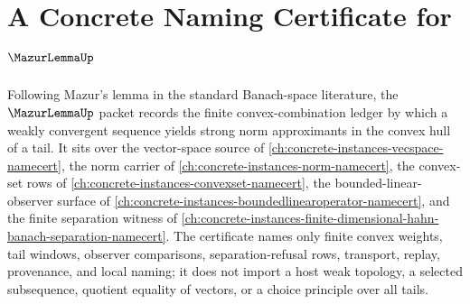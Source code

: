\chapter{A Concrete Naming Certificate for $\MazurLemmaUp$}
\label{ch:concrete-instances-mazur-lemma-namecert}

Following Mazur's lemma in the standard Banach-space literature, the $\MazurLemmaUp$ packet records the finite convex-combination ledger by which a weakly convergent sequence yields strong norm approximants in the convex hull of a tail. It sits over the vector-space source of \autoref{ch:concrete-instances-vecspace-namecert}, the norm carrier of \autoref{ch:concrete-instances-norm-namecert}, the convex-set rows of \autoref{ch:concrete-instances-convexset-namecert}, the bounded-linear-observer surface of \autoref{ch:concrete-instances-boundedlinearoperator-namecert}, and the finite separation witness of \autoref{ch:concrete-instances-finite-dimensional-hahn-banach-separation-namecert}. The certificate names only finite convex weights, tail windows, observer comparisons, separation-refusal rows, transport, replay, provenance, and local naming; it does not import a host weak topology, a selected subsequence, quotient equality of vectors, or a choice principle over all tails.

